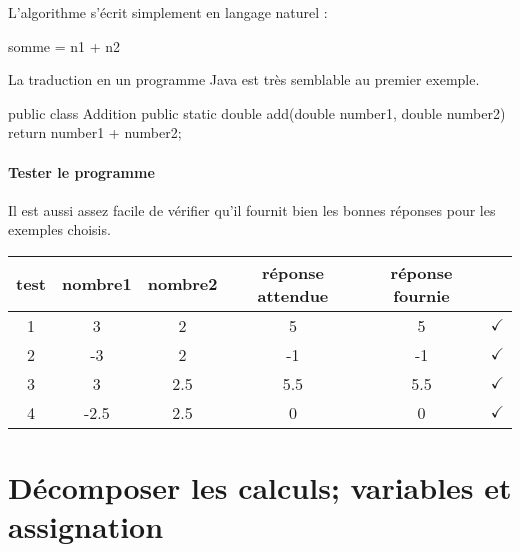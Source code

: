 \begin{Emphase}
				L’algorithme s’écrit simplement en langage naturel :

				\begin{langagenaturel}
					somme = n1 + n2
				\end{langagenaturel}

				La traduction en un programme Java est très semblable au 
				premier exemple. 

				\begin{java}
public class Addition{
	public static double add(double number1, double number2){
		return number1 + number2;
	}
}			
				\end{java}

				
				\paragraph{Tester le programme}
				
				Il est aussi assez facile de vérifier qu’il fournit
				bien les bonnes réponses pour les exemples choisis.				


				\begin{center}
				\begin{tabular}{|c|cccc|c|}
				\hline
				\rowcolor{black!40}
				test \no & nombre1 & nombre2 & réponse attendue 
				  & réponse fournie & {} \\
				\hline 
				1 & 3    & 2   & 5   & 5   
					& {\color{ForestGreen}$\checkmark$} \\\hline
				2 & -3   & 2   & -1  & -1  
					& {\color{ForestGreen}$\checkmark$} \\\hline
				3 & 3    & 2.5 & 5.5 & 5.5 
					& {\color{ForestGreen}$\checkmark$} \\\hline
				4 & -2.5 & 2.5 & 0   & 0   
					& {\color{ForestGreen}$\checkmark$} \\\hline
				\end{tabular}
				\end{center}				

			\end{Emphase}
		
	
	
	
	\section{Décomposer les calculs; variables et assignation}
	
